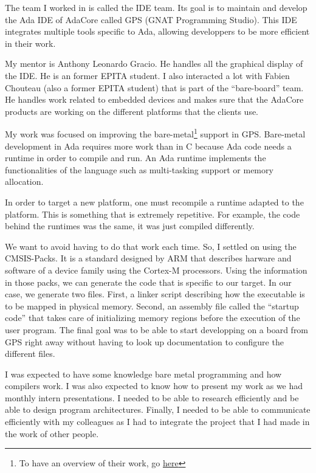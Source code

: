 \documentclass[12pt,]{article}
\begin{document}
The team I worked in is called the IDE team. Its goal is to maintain and
develop the Ada IDE of AdaCore called GPS (GNAT Programming Studio).
This IDE integrates multiple tools specific to Ada, allowing developpers
to be more efficient in their work.

My mentor is Anthony Leonardo Gracio. He handles all the graphical
display of the IDE. He is an former EPITA student. I also interacted a
lot with Fabien Chouteau (also a former EPITA student) that is part of
the \enquote{bare-board} team. He handles work related to embedded
devices and makes sure that the AdaCore products are working on the
different platforms that the clients use.

My work was focused on improving the bare-metal\footnote{To have an
  overview of their work, go
  \href{https://www.adacore.com/industries}{here}} support in GPS.
Bare-metal development in Ada requires more work than in C because Ada
code needs a runtime in order to compile and run. An Ada runtime
implements the functionalities of the language such as multi-tasking
support or memory allocation.

In order to target a new platform, one must recompile a runtime adapted
to the platform. This is something that is extremely repetitive. For
example, the code behind the runtimes was the same, it was just compiled
differently.

We want to avoid having to do that work each time. So, I settled on
using the CMSIS-Packs. It is a standard designed by ARM that describes
harware and software of a device family using the Cortex-M processors.
Using the information in those packs, we can generate the code that is
specific to our target. In our case, we generate two files. First, a
linker script describing how the executable is to be mapped in physical
memory. Second, an assembly file called the \enquote{startup code} that
takes care of initializing memory regions before the execution of the
user program. The final goal was to be able to start developping on a
board from GPS right away without having to look up documentation to
configure the different files.

I was expected to have some knowledge bare metal programming and how
compilers work. I was also expected to know how to present my work as we
had monthly intern presentations. I needed to be able to research
efficiently and be able to design program architectures. Finally, I
needed to be able to communicate efficiently with my colleagues as I had
to integrate the project that I had made in the work of other people.
\end{document}
